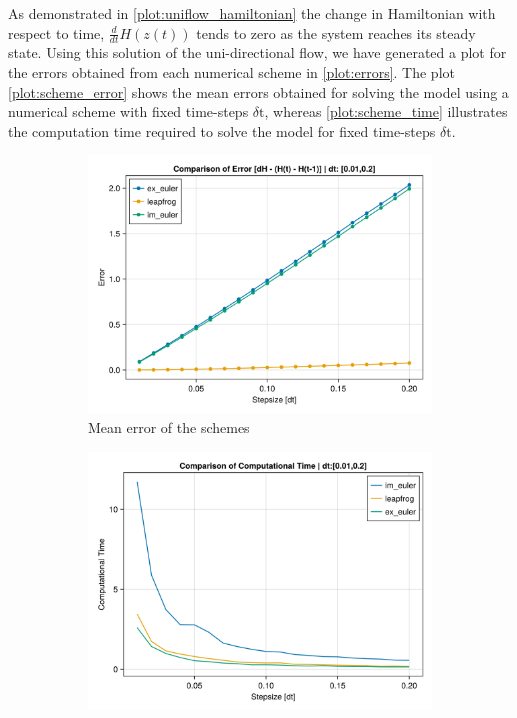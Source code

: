As demonstrated in \autoref{plot:uniflow_hamiltonian} the change in Hamiltonian with respect to time, $\frac{d}{dt}H(z(t))$ tends to zero as the system reaches its steady state. Using this solution of the uni-directional flow, we have generated a plot for the errors obtained from each numerical scheme in \autoref{plot:errors}. The plot \autoref{plot:scheme_error} shows the mean errors obtained for solving the model using a numerical scheme with fixed time-steps $\delta \text{t}$, whereas \autoref{plot:scheme_time} illustrates the computation time required to solve the model for fixed time-steps $\delta \text{t}$.

\begin{figure}[H]
    \centering
    \begin{subfigure}{.49\textwidth}
        \centering
        \includegraphics[width=\linewidth]{figures/ch4_uniflow/leapfrog_compare.png}
        \caption{Mean error of the schemes}
        \label{plot:scheme_error}
    \end{subfigure}
    \begin{subfigure}{.49\textwidth}
        \centering
        \includegraphics[width=\linewidth]{figures/ch4_uniflow/time1.png}

\end{subfigure}
\end{figure}
